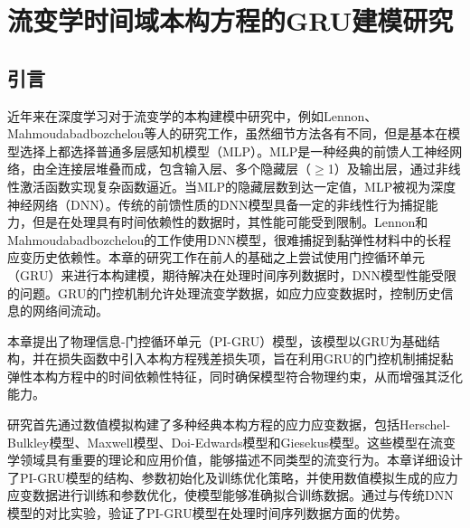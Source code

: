 \chapter{流变学时间域本构方程的GRU建模研究}
\section{引言}
近年来在深度学习对于流变学的本构建模中研究中，例如Lennon、Mahmoudabadbozchelou等人的研究工作，虽然细节方法各有不同，但是基本在模型选择上都选择普通多层感知机模型（MLP）\cite{lennonScientificMachineLearning2023a,mahmoudabadbozchelouDatadrivenPhysicsinformedConstitutive2021}。MLP是一种经典的前馈人工神经网络，由全连接层堆叠而成，包含输入层、多个隐藏层（$\geqslant$1）及输出层，通过非线性激活函数实现复杂函数逼近。当MLP的隐藏层数到达一定值，MLP被视为深度神经网络（DNN）。传统的前馈性质的DNN模型具备一定的非线性行为捕捉能力，但是在处理具有时间依赖性的数据时，其性能可能受到限制。Lennon和Mahmoudabadbozchelou的工作使用DNN模型，很难捕捉到黏弹性材料中的长程应变历史依赖性。本章的研究工作在前人的基础之上尝试使用门控循环单元（GRU）来进行本构建模，期待解决在处理时间序列数据时，DNN模型性能受限的问题。GRU的门控机制允许处理流变学数据，如应力应变数据时，控制历史信息的网络间流动。

本章提出了物理信息-门控循环单元（PI-GRU）模型，该模型以GRU为基础结构，并在损失函数中引入本构方程残差损失项，旨在利用GRU的门控机制捕捉黏弹性本构方程中的时间依赖性特征，同时确保模型符合物理约束，从而增强其泛化能力。

研究首先通过数值模拟构建了多种经典本构方程的应力应变数据，包括Herschel-Bulkley模型、Maxwell模型、Doi-Edwards模型和Giesekus模型。这些模型在流变学领域具有重要的理论和应用价值，能够描述不同类型的流变行为。本章详细设计了PI-GRU模型的结构、参数初始化及训练优化策略，并使用数值模拟生成的应力应变数据进行训练和参数优化，使模型能够准确拟合训练数据。通过与传统DNN模型的对比实验，验证了PI-GRU模型在处理时间序列数据方面的优势。

